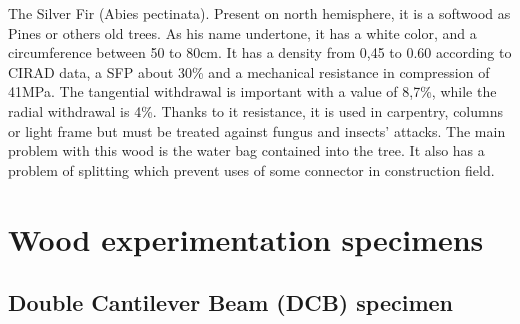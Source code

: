 The Silver Fir (Abies pectinata). Present on north hemisphere, it is a softwood as Pines or others old trees. As his name undertone, it has a white color, and a circumference between 50 to 80cm. It has a density from 0,45 to 0.60 according to CIRAD data, a SFP about 30\% and a mechanical resistance in compression of 41MPa. The tangential withdrawal is important with a value of 8,7\%, while the radial withdrawal is 4\%. Thanks to it resistance, it is used in carpentry, columns or light frame but must be treated against fungus and insects’ attacks. The main problem with this wood is the water bag contained into the tree. It also has a problem of splitting which prevent uses of some connector in construction field.

\section{Wood experimentation specimens}


\subsection{ Double Cantilever Beam (DCB) specimen}


